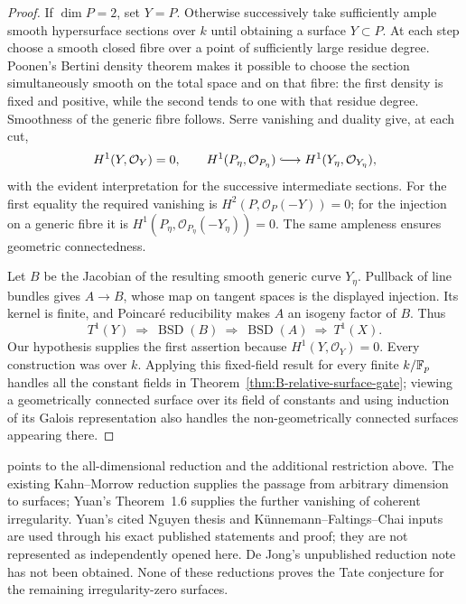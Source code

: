 \begin{proof}
If \(\dim P=2\), set \(Y=P\).  Otherwise successively take
sufficiently ample smooth hypersurface sections over \(k\) until
obtaining a surface \(Y\subset P\).  At each step choose a smooth
closed fibre over a point of sufficiently large residue degree.
Poonen's Bertini density theorem
\citep[Theorem~1.1, author-version p.~2]{DPoonen2004Bertini}
makes it possible to choose the
section simultaneously smooth on the total space and on that fibre:
the first density is fixed and positive, while the second tends to
one with that residue degree.  Smoothness of the generic fibre
follows.  Serre vanishing and duality give, at each cut,
\[
 H^1(Y,\mathcal O_Y)=0,
 \qquad
 H^1(P_\eta,\mathcal O_{P_\eta})
       \lhook\joinrel\longrightarrow H^1(Y_\eta,\mathcal O_{Y_\eta}),
\]
with the evident interpretation for the successive intermediate
sections.  For the first equality the required vanishing is
\(H^2(P,\mathcal O_P(-Y))=0\); for the injection on a generic
fibre it is \(H^1(P_\eta,\mathcal O_{P_\eta}(-Y_\eta))=0\).
The same ampleness ensures geometric connectedness.

Let \(B\) be the Jacobian of the resulting smooth generic curve
\(Y_\eta\).  Pullback of line bundles gives \(A\to B\), whose map
on tangent spaces is the displayed injection.  Its kernel is
finite, and Poincar\'e reducibility makes \(A\) an isogeny factor of
\(B\).  Thus
\[
 T^1(Y)\ \Longrightarrow\ \operatorname{BSD}(B)
       \ \Longrightarrow\ \operatorname{BSD}(A)
       \ \Longrightarrow\ T^1(X).
\]
Our hypothesis supplies the first assertion because
\(H^1(Y,\mathcal O_Y)=0\).  Every construction was over \(k\).
Applying this fixed-field result for every finite \(k/\mathbb F_p\)
handles all the constant fields in
Theorem~\ref{thm:B-relative-surface-gate}; viewing a geometrically
connected surface over its field of constants and using induction
of its Galois representation also handles the non-geometrically
connected surfaces appearing there.
\end{proof}

\begin{remark}
\label{rem:B-irregularity-zero-source-scope}
\citet[Remark~4.13, p.~56]{BErtlKellerQin2025} points to the
all-dimensional reduction and the additional restriction above.
The existing Kahn--Morrow reduction supplies the passage from
arbitrary dimension to surfaces; Yuan's Theorem~1.6 supplies the
further vanishing of coherent irregularity.  Yuan's cited
Nguyen thesis and K\"unnemann--Faltings--Chai inputs are used through
his exact published statements and proof; they are not represented
as independently opened here.  De Jong's unpublished reduction note
has not been obtained.  None of these reductions proves the Tate
conjecture for the remaining irregularity-zero surfaces.
\end{remark}


